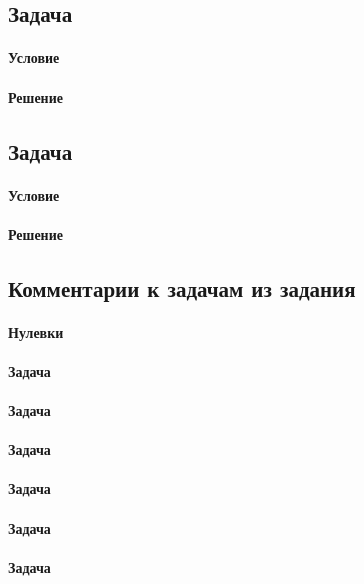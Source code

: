 \documentclass[12pt]{article}
\begin{document}
\subsection{Задача}
\label{task_}
\paragraph{Условие}
\paragraph{Решение}

\subsection{Задача}
\label{task_}
\paragraph{Условие}
\paragraph{Решение}

\subsection{Комментарии к задачам из задания}
\paragraph{Нулевки} 
\paragraph{Задача } 
\paragraph{Задача } 
\paragraph{Задача }
\paragraph{Задача }
\paragraph{Задача }
\paragraph{Задача }
\end{document}
